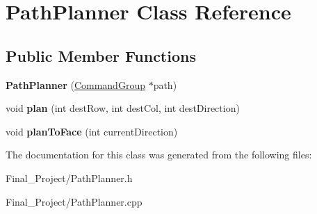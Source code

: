 \hypertarget{classPathPlanner}{\section{Path\-Planner Class Reference}
\label{classPathPlanner}
}
\subsection*{Public Member Functions}
\begin{DoxyCompactItemize}
\item 
\hypertarget{classPathPlanner_a09453b54df73c22775e488a20d6a3e82}{{\bfseries Path\-Planner} (\hyperlink{classCommandGroup}{Command\-Group} $\ast$path)}\label{classPathPlanner_a09453b54df73c22775e488a20d6a3e82}

\item 
\hypertarget{classPathPlanner_a82f75ef3111891f20ba2c59f8b305d55}{void {\bfseries plan} (int dest\-Row, int dest\-Col, int dest\-Direction)}\label{classPathPlanner_a82f75ef3111891f20ba2c59f8b305d55}

\item 
\hypertarget{classPathPlanner_a435470288f6e2b5f99ce590db0bfc5db}{void {\bfseries plan\-To\-Face} (int current\-Direction)}\label{classPathPlanner_a435470288f6e2b5f99ce590db0bfc5db}

\end{DoxyCompactItemize}


The documentation for this class was generated from the following files\-:\begin{DoxyCompactItemize}
\item 
Final\-\_\-\-Project/Path\-Planner.\-h\item 
Final\-\_\-\-Project/Path\-Planner.\-cpp\end{DoxyCompactItemize}
